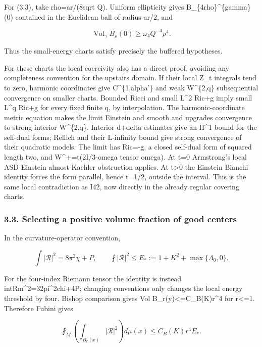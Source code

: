 \documentclass[
  10pt,
]{article}
\begin{document}
For (3.3), take rho=ar/(8sqrt Q). Uniform ellipticity gives
B\_\{4rho\}\^{}\{gamma\}(0) contained in the Euclidean ball of radius
ar/2, and

\[
 \operatorname{Vol}_{\gamma}B_\rho(0)
                         \ge\omega_4Q^{-4}\rho^4.
\]

Thus the small-energy charts satisfy precisely the buffered hypotheses.

For these charts the local coercivity also has a direct proof, avoiding
any completeness convention for the upstairs domain. If their local Z\_t
integrals tend to zero, harmonic coordinates give C\^{}\{1,alpha'\} and
weak W\^{}\{2,q\} subsequential convergence on smaller charts. Bounded
Ricci and small L\^{}2 Ric+g imply small L\^{}q Ric+g for every fixed
finite q, by interpolation. The harmonic-coordinate metric equation
makes the limit Einstein and smooth and upgrades convergence to strong
interior W\^{}\{2,q\}. Interior d+delta estimates give an H\^{}1 bound
for the self-dual forms; Rellich and their L-infinity bound give strong
convergence of their quadratic models. The limit has Ric=-g, a closed
self-dual form of squared length two, and W\^{}+=t(2I/3-omega tensor
omega). At t=0 Armstrong's local ASD Einstein almost-Kaehler obstruction
applies. At t\textgreater0 the Einstein Bianchi identity forces the form
parallel, hence t=1/2, outside the interval. This is the same local
contradiction as I42, now directly in the already regular covering
charts.

\hypertarget{selecting-a-positive-volume-fraction-of-good-centers}{%
\subsubsection{3.3. Selecting a positive volume fraction of good
centers}\label{selecting-a-positive-volume-fraction-of-good-centers}}

In the curvature-operator convention,

\[
 \int|\mathscr R|^2=8\pi^2\chi+P,
 \qquad \fint|\mathscr R|^2\le
 E_*:=1+K^2+\max\{\Lambda_0,0\}.                    \tag{3.6}
\]

For the four-index Riemann tensor the identity is instead
int\textbar Rm\textbar\^{}2=32pi\^{}2chi+4P; changing conventions only
changes the local energy threshold by four. Bishop comparison gives Vol
B\_r(y)\textless=C\_B(K)r\^{}4 for r\textless=1. Therefore Fubini gives

\[
 \fint_M\left(\int_{B_r(x)}|\mathscr R|^2\right)d\mu(x)
                          \le C_B(K)r^4E_*.
\]
\end{document}
